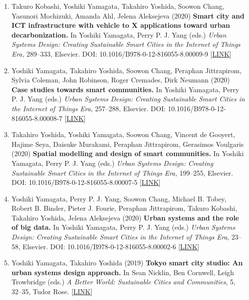 \documentclass[
]{book}
\begin{document}
\begin{enumerate}
\item
  Takuro Kobashi, Yoshiki Yamagata, Takahiro Yoshida, Soowon Chang, Yasunori Mochizuki, Amanda Ahl, Jelena Aleksejeva (2020)
  \textbf{Smart city and ICT infrastructure with vehicle to X applications toward urban decarbonization.}
  In Yoshiki Yamagata, Perry P. J. Yang (eds.)
  \emph{Urban Systems Design: Creating Sustainable Smart Cities in the Internet of Things Era,} 289--333, Elsevier.
  DOI: 10.1016/B978-0-12-816055-8.00009-9 {[}\href{https://www.elsevier.com/books/urban-systems-design/yamagata/978-0-12-816055-8}{LINK}{]}
\item
  Yoshiki Yamagata, Takahiro Yoshida, Soowon Chang, Peraphan Jittrapirom, Sylvia Coleman, John Robinson, Roger Cremades, Dirk Neumann (2020)
  \textbf{Case studies towards smart communities.}
  In Yoshiki Yamagata, Perry P. J. Yang (eds.)
  \emph{Urban Systems Design: Creating Sustainable Smart Cities in the Internet of Things Era,} 257--288, Elsevier.
  DOI: 10.1016/B978-0-12-816055-8.00008-7 {[}\href{https://www.elsevier.com/books/urban-systems-design/yamagata/978-0-12-816055-8}{LINK}{]}
\item
  Takahiro Yoshida, Yoshiki Yamagata, Soowon Chang, Vincent de Gooyert, Hajime Seya, Daisuke Murakami, Peraphan Jittrapirom, Gerasimos Voulgaris (2020)
  \textbf{Spatial modelling and design of smart communities.}
  In Yoshiki Yamagata, Perry P. J. Yang (eds.)
  \emph{Urban Systems Design: Creating Sustainable Smart Cities in the Internet of Things Era,} 199--255, Elsevier.
  DOI: 10.1016/B978-0-12-816055-8.00007-5 {[}\href{https://www.elsevier.com/books/urban-systems-design/yamagata/978-0-12-816055-8}{LINK}{]}
\item
  Yoshiki Yamagata, Perry P. J. Yang, Soowon Chang, Michael B. Tobey, Robert B. Binder, Pieter J. Fourie, Peraphan Jittrapirom, Takuro Kobashi, Takahiro Yoshida, Jelena Aleksejeva (2020)
  \textbf{Urban systems and the role of big data.}
  In Yoshiki Yamagata, Perry P. J. Yang (eds.)
  \emph{Urban Systems Design: Creating Sustainable Smart Cities in the Internet of Things Era}, 23--58, Elsevier.
  DOI: 10.1016/B978-0-12-816055-8.00002-6 {[}\href{https://www.elsevier.com/books/urban-systems-design/yamagata/978-0-12-816055-8}{LINK}{]}
\item
  Yoshiki Yamagata, Takahiro Yoshida (2019)
  \textbf{Tokyo smart city studio: An urban systems design approach.}
  In Sean Nicklin, Ben Cornwell, Leigh Trowbridge (eds.)
  \emph{A Better World: Sustainable Cities and Communities}, 5, 32--35, Tudor Rose.
  {[}\href{http://unhabitat.org.mm/publications/a-better-world-volume-5/}{LINK}{]}

\end{enumerate}
\end{document}
